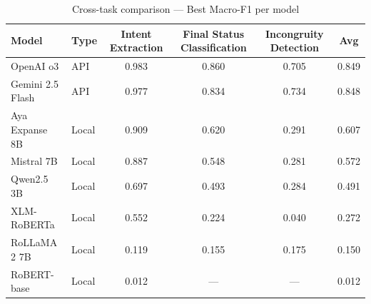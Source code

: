 \begin{table}[H]
\centering
\footnotesize
\caption{Cross-task comparison — Best Macro-F1 per model}
\label{tab:cross-task}
\begin{tabular}{llcccc}
\toprule
\textbf{Model} & \textbf{Type} & \textbf{Intent Extraction} & \textbf{Final Status Classification} & \textbf{Incongruity Detection} & \textbf{Avg} \\
\midrule
OpenAI o3 & API & 0.983 & 0.860 & 0.705 & 0.849 \\
Gemini 2.5 Flash & API & 0.977 & 0.834 & 0.734 & 0.848 \\
Aya Expanse 8B & Local & 0.909 & 0.620 & 0.291 & 0.607 \\
Mistral 7B & Local & 0.887 & 0.548 & 0.281 & 0.572 \\
Qwen2.5 3B & Local & 0.697 & 0.493 & 0.284 & 0.491 \\
XLM-RoBERTa & Local & 0.552 & 0.224 & 0.040 & 0.272 \\
RoLLaMA 2 7B & Local & 0.119 & 0.155 & 0.175 & 0.150 \\
RoBERT-base & Local & 0.012 & — & — & 0.012 \\
\bottomrule
\end{tabular}
\end{table}